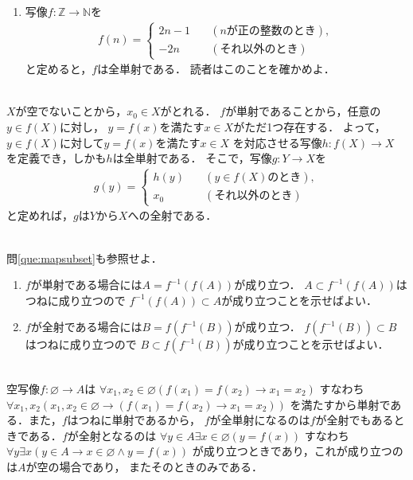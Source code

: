 \begin{description}
\begin{enumerate}[(1) ]
    \item 写像$f: \mathbb{Z} \longrightarrow \mathbb{N}$を
      \begin{align*}
        f(n) = \left\{
          \begin{aligned}
            2n - 1 \quad & ( \text{$n$が正の整数のとき} ) , \\
            -2n  \quad \; \; &  ( \text{それ以外のとき} )
          \end{aligned}
        \right.
      \end{align*}
      と定めると，$f$は全単射である．
      読者はこのことを確かめよ．
  \end{enumerate}
\item[\refque{que:injecsurjec}] \mbox{} \\
  $X$が空でないことから，$x_0 \in X$がとれる．
  $f$が単射であることから，任意の$y \in f(X)$に対し，
  $y=f(x)$を満たす$x \in X$がただ1つ存在する．
  よって，$y \in f(X)$に対して$y=f(x)$を満たす$x \in X$
  を対応させる写像$h: f(X) \longrightarrow X$
  を定義でき，しかも$h$は全単射である．
  そこで，写像$g: Y \longrightarrow X$を
  \begin{align*}
    g(y) = \left\{
      \begin{aligned}
          h (y) \quad & ( \text{$y \in f(X)$のとき} ) , \\
          x_0 \quad \ & ( \text{それ以外のとき} ) 
      \end{aligned}
      \right.
  \end{align*}
  と定めれば，$g$は$Y$から$X$への全射である．

\item[\refque{que:injecsurjecsubset}] \mbox{} \\
  問\ref{que:mapsubset}も参照せよ．
  \begin{enumerate}[(1) ]
    \item $f$が単射である場合には$A= f^{-1}(f(A))$が成り立つ．
      $A \subset f^{-1}(f(A))$はつねに成り立つので
      $f^{-1}(f(A)) \subset A$が成り立つことを示せばよい．
    \item $f$が全射である場合には$B = f(f^{-1}(B))$が成り立つ．
      $f(f^{-1}(B)) \subset B$はつねに成り立つので
      $B \subset f(f^{-1}(B))$が成り立つことを示せばよい．
   \end{enumerate}
 
 \item[\refque{que:emptymapping}] \mbox{} \\
  空写像$f: \varnothing \longrightarrow A$は
  $\forall x_1 , x_2 \in \varnothing ( f(x_1 ) = f(x_2) \to x_1 = x_2)$
  すなわち$\forall x_1 , x_2 ( x_1 , x_2 \in \varnothing \to ( f(x_1)=f(x_2) \to x_1 = x_2))$
  を満たすから単射である．また，$f$はつねに単射であるから，
  $f$が全単射になるのは$f$が全射でもあるときである．$f$が全射となるのは
  $\forall y \in A \exists x \in \varnothing ( y = f(x))$
  すなわち$\forall y \exists x (y \in A \to x \in \varnothing \land y=f(x))$
  が成り立つときであり，これが成り立つのは$A$が空の場合であり，
  またそのときのみである．



\end{description}
